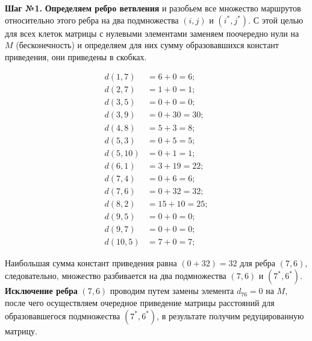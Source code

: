 \documentclass[17pt]{extarticle}
\begin{document}
\textbf{Шаг №1.}
\textbf{Определяем ребро ветвления} и разобьем все множество маршрутов относительно этого ребра на два подмножества \((i,j)\) и \((i^*,j^*)\).
С этой целью для всех клеток матрицы с нулевыми элементами заменяем поочередно нули на \( M \) (бесконечность) и определяем для них сумму образовавшихся констант приведения, они приведены в скобках.

\[
    \begin{aligned}
        d(1,7)  & = 6 + 0 = 6;    \\
        d(2,7)  & = 1 + 0 = 1;    \\
        d(3,5)  & = 0 + 0 = 0;    \\
        d(3,9)  & = 0 + 30 = 30;  \\
        d(4,8)  & = 5 + 3 = 8;    \\
        d(5,3)  & = 0 + 5 = 5;    \\
        d(5,10) & = 0 + 1 = 1;    \\
        d(6,1)  & = 3 + 19 = 22;  \\
        d(7,4)  & = 0 + 6 = 6;    \\
        d(7,6)  & = 0 + 32 = 32;  \\
        d(8,2)  & = 15 + 10 = 25; \\
        d(9,5)  & = 0 + 0 = 0;    \\
        d(9,7)  & = 0 + 0 = 0;    \\
        d(10,5) & = 7 + 0 = 7;
    \end{aligned}
\]

Наибольшая сумма констант приведения равна \( (0 + 32) = 32 \) для ребра \((7,6)\), следовательно, множество разбивается на два подмножества \((7,6)\) и \((7^*,6^*)\).
\textbf{Исключение ребра} \((7,6)\) проводим путем замены элемента \( d_{76} = 0 \) на \( M \), после чего осуществляем очередное приведение матрицы расстояний для образовавшегося подмножества \((7^*,6^*)\), в результате получим редуцированную матрицу.
\end{document}
